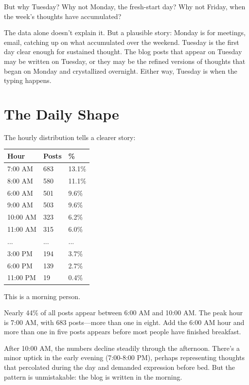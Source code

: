 But why Tuesday? Why not Monday, the fresh-start day? Why not Friday, when the week's thoughts have accumulated?

The data alone doesn't explain it. But a plausible story: Monday is for meetings, email, catching up on what accumulated over the weekend. Tuesday is the first day clear enough for sustained thought. The blog posts that appear on Tuesday may be written on Tuesday, or they may be the refined versions of thoughts that began on Monday and crystallized overnight. Either way, Tuesday is when the typing happens.

\bigskip

\section*{The Daily Shape}

The hourly distribution tells a clearer story:

\begin{center}
\begin{tabular}{lll}
\toprule
\textbf{Hour} & \textbf{Posts} & \textbf{\%} \\
\midrule
7:00 AM & 683 & 13.1\% \\
8:00 AM & 580 & 11.1\% \\
6:00 AM & 501 & 9.6\% \\
9:00 AM & 503 & 9.6\% \\
10:00 AM & 323 & 6.2\% \\
11:00 AM & 315 & 6.0\% \\
... & ... & ... \\
3:00 PM & 194 & 3.7\% \\
6:00 PM & 139 & 2.7\% \\
11:00 PM & 19 & 0.4\% \\
\bottomrule
\end{tabular}
\end{center}

This is a morning person.

Nearly 44\% of all posts appear between 6:00 AM and 10:00 AM. The peak hour is 7:00 AM, with 683 posts—more than one in eight. Add the 6:00 AM hour and more than one in five posts appears before most people have finished breakfast.

After 10:00 AM, the numbers decline steadily through the afternoon. There's a minor uptick in the early evening (7:00-8:00 PM), perhaps representing thoughts that percolated during the day and demanded expression before bed. But the pattern is unmistakable: the blog is written in the morning.

